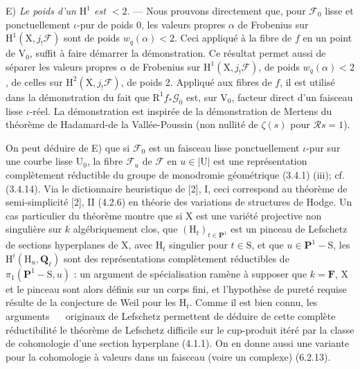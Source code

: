 \documentclass[11pt,leqno]{article}
\newcommand{\Page}[1]{\ifvmode\noindent\else\unskip\ \fi{\footnotesize\textcolor{gray}{[p.\,#1]}}\ \ignorespaces}
\begin{document}
E) \textit{Le poids d’un \(\mathrm{H}^1\) est \(<2\).} — Nous prouvons directement que, pour \(\mathscr{F}_0\) lisse et ponctuellement \(\iota\)-pur de poids 0, les valeurs propres \(\alpha\) de Frobenius sur \(\mathrm{H}^1(\mathrm{X},j_!\mathscr{F})\) sont de poids \(w_q(\alpha)<2\). Ceci appliqué à la fibre de \(f\) en un point de \(\mathrm{V}_0\), suffit à faire démarrer la démonstration. Ce résultat permet aussi de séparer les valeurs propres \(\alpha\) de Frobenius sur \(\mathrm{H}^1(\mathrm{X},j_!\mathscr{F})\), de poids \(w_q(\alpha)<2\), de celles sur \(\mathrm{H}^2(\mathrm{X},j_!\mathscr{F})\), de poids 2. Appliqué aux fibres de \(f\), il est utilisé dans la démonstration du fait que \(\mathrm{R}^1 f_*\mathscr{G}_0\) est, sur \(\mathrm{V}_0\), facteur direct d’un faisceau lisse \(\iota\)-réel. La démonstration est inspirée de la démonstration de Mertens du théorème de Hadamard-de la Vallée-Poussin (non nullité de \(\zeta(s)\) pour \(\mathscr{R}s=1\)).

On peut déduire de E) que si \(\mathscr{F}_0\) est un faisceau lisse ponctuellement \(\iota\)-pur sur une courbe lisse \(\mathrm{U}_0\), la fibre \(\mathscr{F}_u\) de \(\mathscr{F}\) en \(u\in|\mathrm{U}|\) est une représentation complètement réductible du groupe de monodromie géométrique (3.4.1) (iii); cf. (3.4.14). Via le dictionnaire heuristique de [2], I, ceci correspond au théorème de semi-simplicité [2], II (4.2.6) en théorie des variations de structures de Hodge. Un cas particulier du théorème montre que si \(\mathrm{X}\) est une variété projective non singulière sur \(k\) algébriquement clos, que \((\mathrm{H}_t)_{t\in\mathbf{P}^1}\) est un pinceau de Lefschetz de sections hyperplanes de \(\mathrm{X}\), avec \(\mathrm{H}_t\) singulier pour \(t\in\mathrm{S}\), et que \(u\in\mathbf{P}^1-\mathrm{S}\), les \(\mathrm{H}^i(\mathrm{H}_u,\mathbf{Q}_\ell)\) sont des représentations complètement réductibles de \(\pi_1(\mathbf{P}^1-\mathrm{S},u)\) : un argument de spécialisation ramène à supposer que \(k=\mathbf{F}\), \(\mathrm{X}\) et le pinceau sont alors définis sur un corps fini, et l’hypothèse de pureté requise résulte de la conjecture de Weil pour les \(\mathrm{H}_t\). Comme il est bien connu, les arguments
\Page{142}
originaux de Lefschetz permettent de déduire de cette complète réductibilité le théorème de Lefschetz difficile sur le cup-produit itéré par la classe de cohomologie d’une section hyperplane (4.1.1). On en donne aussi une variante pour la cohomologie à valeurs dans un faisceau (voire un complexe) (6.2.13).
\end{document}
